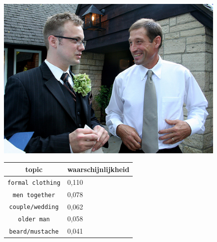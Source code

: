 \begin{figure}[!htb]
    \centering
    \begin{minipage}[t]{.5\linewidth}
    \centering
    \vspace{0pt}
    \includegraphics[width=\textwidth]{Images/LDA/2773744784.jpg}
    \end{minipage}\hfill
    \begin{minipage}[t]{.5\textwidth}
    \centering
    \vspace{0pt}
    \begin{tabular}{cl}
            topic                           & waarschijnlijkheid\\
            \hline
            \texttt{formal clothing}             & 0,110 \\
            \texttt{men together}                   & 0,078 \\
            \texttt{couple/wedding}                 & 0,062 \\
            \texttt{older man}           & 0,058 \\
            \texttt{beard/mustache}        & 0,041\\
            \hline
        \end{tabular}
    \end{minipage}
\end{figure}
\newpage

